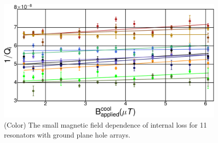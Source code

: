 \begin{figure}
    \begin{center}
        \includegraphics[width=150mm]{DielectricFluxTrap_Supp_Rev2_qnovortex.pdf}
        \caption{(Color)  The small magnetic field dependence of internal loss for 11 resonators with ground plane hole arrays.}
        \label{novortexdata}
    \end{center}
\end{figure}


